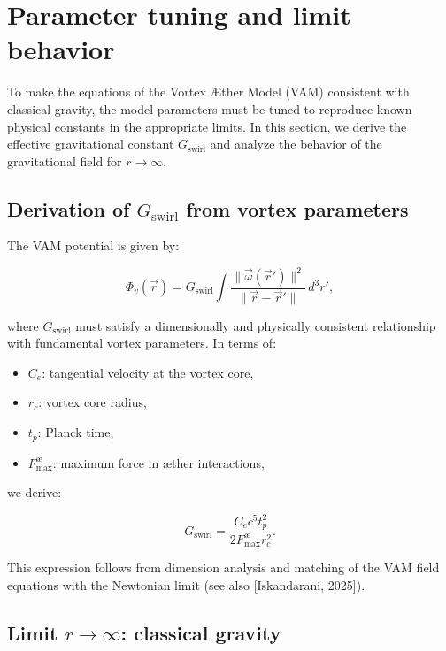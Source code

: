 \section{Parameter tuning and limit behavior}\label{sec:appendix:6}

To make the equations of the Vortex Æther Model (VAM) consistent with classical gravity, the model parameters must be tuned to reproduce known physical constants in the appropriate limits. In this section, we derive the effective gravitational constant $G_\text{swirl}$ and analyze the behavior of the gravitational field for $r \to \infty$.

\subsection{Derivation of $G_\text{swirl}$ from vortex parameters}

The VAM potential is given by:

\begin{equation}
  \Phi_v(\vec{r}) = G_\text{swirl} \int \frac{\|\vec{\omega}(\vec{r}')\|^2}{\|\vec{r} - \vec{r}'\|} \, d^3r',
\end{equation}

where $G_\text{swirl}$ must satisfy a dimensionally and physically consistent relationship with fundamental vortex parameters. In terms of:

\begin{itemize}
  \item $C_e$: tangential velocity at the vortex core,
  \item $r_c$: vortex core radius,
  \item $t_p$: Planck time,
  \item $F^{\text{\ae}}_{\text{max}}$: maximum force in æther interactions,
\end{itemize}

we derive:

\begin{equation}
  G_\text{swirl} = \frac{C_e c^5 t_p^2}{2 F^{\text{\ae}}_{\text{max}} r_c^2}.
\end{equation}

This expression follows from dimension analysis and matching of the VAM field equations with the Newtonian limit (see also [Iskandarani, 2025]).

\subsection{Limit $r \to \infty$: classical gravity}

